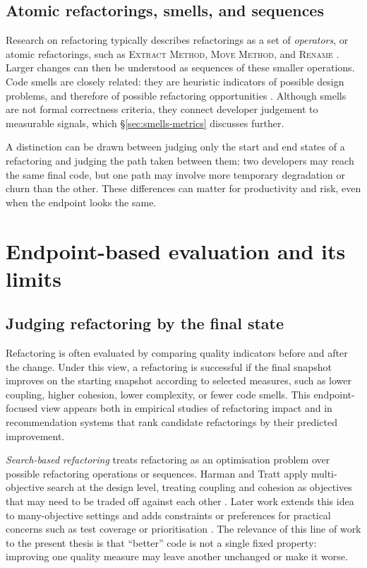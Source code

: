 \subsection{Atomic refactorings, smells, and sequences}
Research on refactoring typically describes refactorings as a set of \emph{operators}, or atomic refactorings, such as \textsc{Extract Method}, \textsc{Move Method}, and \textsc{Rename} \cite{fowler1999refactoring,mens2004survey}. Larger changes can then be understood as sequences of these smaller operations. Code smells are closely related: they are heuristic indicators of possible design problems, and therefore of possible refactoring opportunities \cite{fowler1999refactoring,fowler2018refactoring}. Although smells are not formal correctness criteria, they connect developer judgement to measurable signals, which \S\ref{sec:smells-metrics} discusses further.

A distinction can be drawn between judging only the start and end states of a refactoring and judging the path taken between them: two developers may reach the same final code, but one path may involve more temporary degradation or churn than the other. These differences can matter for productivity and risk, even when the endpoint looks the same.

\section{Endpoint-based evaluation and its limits}
\label{sec:outcome-eval}

\subsection{Judging refactoring by the final state}
Refactoring is often evaluated by comparing quality indicators before and after the change. Under this view, a refactoring is successful if the final snapshot improves on the starting snapshot according to selected measures, such as lower coupling, higher cohesion, lower complexity, or fewer code smells. This endpoint-focused view appears both in empirical studies of refactoring impact and in recommendation systems that rank candidate refactorings by their predicted improvement.

\emph{Search-based refactoring} treats refactoring as an optimisation problem over possible refactoring operations or sequences. Harman and Tratt apply multi-objective search at the design level, treating coupling and cohesion as objectives that may need to be traded off against each other \cite{harman2007pareto}. Later work extends this idea to many-objective settings and adds constraints or preferences for practical concerns such as test coverage or prioritisation \cite{mohan2019manyobjective}. The relevance of this line of work to the present thesis is that ``better'' code is not a single fixed property: improving one quality measure may leave another unchanged or make it worse.

